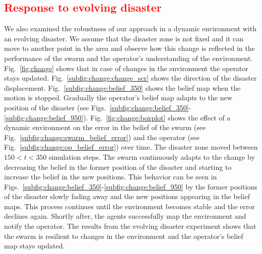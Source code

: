 \documentclass[runningheads]{llncs}%
\begin{document}
\subsection{\textcolor{red}{Response to evolving disaster}}
We also examined the robustness of our approach in a dynamic environment with an evolving disaster. We assume that the disaster zone is not fixed and it can move to another point in the area and observe how this change is reflected in the performance of the swarm and the operator's understanding of the environment. Fig.~\ref{fig:change} shows that in case of changes in the environment the operator stays updated. Fig.~\ref{subfig:change:change_scr} shows the direction of the disaster displacement. Fig.~\ref{subfig:change:belief_350} shows the belief map when the motion is stopped. 
Gradually the operator's belief map adapts to the new position of the disaster (see Figs.~\ref{subfig:change:belief_350}-\ref{subfig:change:belief_950}). Fig.~\ref{fig:change:boxplot} shows the effect of a dynamic environment on the error in the belief of the swarm (see Fig.~\ref{subfig:change:swarm_belief_error}) and the operator (see Fig.~\ref{subfig:change:op_belief_error}) over time. The disaster zone moved between $150 < t < 350$ simulation steps. %
The swarm continuously adapts to the change by decreasing the belief in the former position of the disaster and starting to increase the belief in the new positions. This behavior can be seen in Figs.~\ref{subfig:change:belief_350}-\ref{subfig:change:belief_950} by the former positions of the disaster slowly fading away and the new positions appearing in the belief maps. This process continues until the environment becomes stable and the error declines again. Shortly after, the agents successfully map the environment and notify the operator. The results from the evolving disaster experiment shows that the swarm is resilient to changes in the environment and the operator's belief map stays updated. 


    
    
\end{document}
